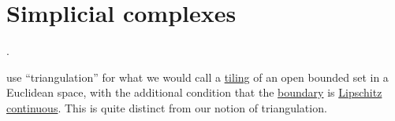 \section{Simplicial complexes}\label{sec:simplicial_complexes}

\begin{definition}\label{def:triangulation}
  .
\end{definition}
\begin{comments}
  \item {} use \enquote{triangulation} for what we would call a \hyperref[def:topological_space_tiling]{tiling} of an open bounded set in a Euclidean space, with the additional condition that the \hyperref[def:topological_boundary_operator]{boundary} is \hyperref[def:lipschitz_continuity]{Lipschitz continuous}. This is quite distinct from our notion of triangulation.
\end{comments}
